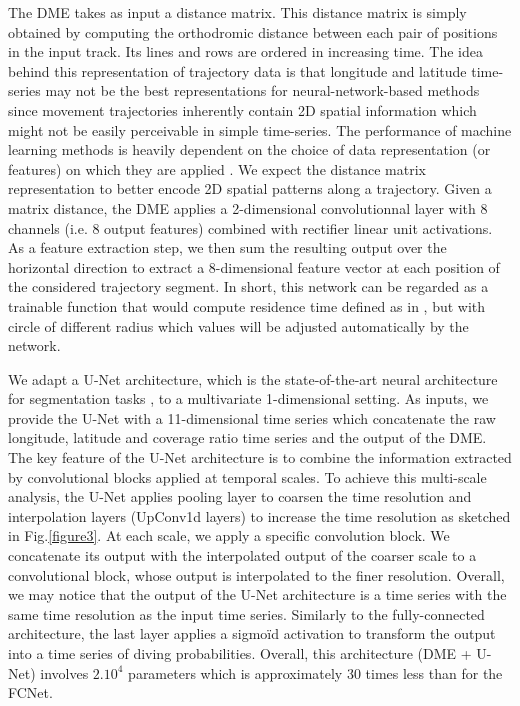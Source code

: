 \documentclass{article}
\begin{document}
The DME takes as input a distance matrix.
This distance matrix is simply obtained by computing the orthodromic distance between each pair of positions in the input track. Its lines and rows are ordered in increasing time.
The idea behind this representation of trajectory data is that longitude and latitude time-series may not be the best representations for neural-network-based methods since movement trajectories inherently contain 2D spatial information which might not be easily perceivable in simple time-series.
The performance of machine learning methods is heavily dependent on the choice of data representation (or features) on which they are applied \cite{bengio_representation_2014}. We expect the distance matrix representation to better encode 2D spatial patterns along a trajectory.
Given a matrix distance, the DME applies a 2-dimensional convolutionnal layer with 8 channels (i.e. 8 output features) combined with rectifier linear unit activations.
As a feature extraction step, we then sum the resulting output over the horizontal direction to extract a 8-dimensional feature vector at each position of the considered trajectory segment.
In short, this network can be regarded as a trainable function that would compute residence time defined as in \cite{barraquand_animal_2008}, but with circle of different radius which values will be adjusted automatically by the network.

We adapt a U-Net architecture, which is the state-of-the-art neural architecture for segmentation tasks \cite{ronneberger_u-net_2015}, to a multivariate 1-dimensional setting.
As inputs, we provide the U-Net with a 11-dimensional time series which concatenate the raw longitude, latitude and coverage ratio time series and the output of the DME. The key feature of the U-Net architecture is to combine the information extracted by convolutional blocks applied at temporal scales. To achieve this multi-scale analysis, the U-Net applies pooling layer to coarsen the time resolution and interpolation layers (UpConv1d layers) to increase the time resolution as sketched in Fig.\ref{figure3}. At each scale, we apply a specific convolution block. We concatenate its output with the interpolated output of the coarser scale to a convolutional block, whose output is interpolated to the finer resolution. Overall, we may notice that the output of the U-Net architecture is a time series with the same time resolution as the input time series. Similarly to the fully-connected architecture, the last layer applies a sigmoïd activation to transform the output into a time series of diving probabilities. Overall, this architecture (DME + U-Net) involves $2.10^{4}$ parameters which is approximately 30 times less than for the FCNet.
\end{document}
